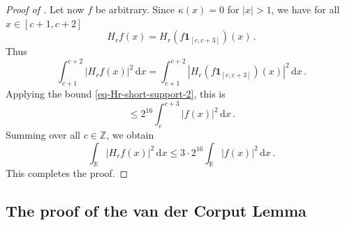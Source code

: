 \documentclass[10pt,a4paper]{article}
\theoremstyle{plain}
\theoremstyle{definition}
\numberwithin{equation}{subsection}
\newcommand{\R}{{\mathbb{R}}}
\begin{document}
\begin{proof}[Proof of ]
    Let now $f$ be arbitrary.
    Since $\kappa(x) = 0$ for $|x| > 1$, we have for all $x \in [c+1, c+2]$
    $$
        H_rf(x) = H_r(f \mathbf{1}_{[c, c+3]})(x)\,.
    $$
    Thus
    $$
        \int_{c+1}^{c+2} |H_r f(x)|^2 \, \mathrm{d}x = \int_{c+1}^{c+2}|H_r(f \mathbf{1}_{[c, c+3]})(x)|^2 \, \mathrm{d}x\,.
    $$
    Applying the bound \eqref{eq-Hr-short-support-2}, this is
    $$
        \le 2^{16} \int_{c}^{c+3} |f(x)|^2 \, \mathrm{d}x\,.
    $$
    Summing over all $c \in \mathbb{Z}$, we obtain
    $$
        \int_{\R} |H_rf(x)|^2 \, \mathrm{d}x \le 3 \cdot 2^{16} \int_{\R} |f(x)|^2 \, \mathrm{d}x\,.
    $$
    This completes the proof.
\end{proof}







\subsection{The proof of the van der Corput Lemma}
\label{10vandercorput}
\end{document}

